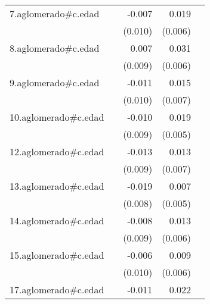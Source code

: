 {\begin{longtable}{l*{4}{D{.}{.}{-1}}}
\addlinespace
7.aglomerado#c.edad&                     &      -0.007         &       0.019\sym{**} &                     \\
            &                     &     (0.010)         &     (0.006)         &                     \\
\addlinespace
8.aglomerado#c.edad&                     &       0.007         &       0.031\sym{***}&                     \\
            &                     &     (0.009)         &     (0.006)         &                     \\
\addlinespace
9.aglomerado#c.edad&                     &      -0.011         &       0.015\sym{*}  &                     \\
            &                     &     (0.010)         &     (0.007)         &                     \\
\addlinespace
10.aglomerado#c.edad&                     &      -0.010         &       0.019\sym{***}&                     \\
            &                     &     (0.009)         &     (0.005)         &                     \\
\addlinespace
12.aglomerado#c.edad&                     &      -0.013         &       0.013         &                     \\
            &                     &     (0.009)         &     (0.007)         &                     \\
\addlinespace
13.aglomerado#c.edad&                     &      -0.019\sym{*}  &       0.007         &                     \\
            &                     &     (0.008)         &     (0.005)         &                     \\
\addlinespace
14.aglomerado#c.edad&                     &      -0.008         &       0.013\sym{*}  &                     \\
            &                     &     (0.009)         &     (0.006)         &                     \\
\addlinespace
15.aglomerado#c.edad&                     &      -0.006         &       0.009         &                     \\
            &                     &     (0.010)         &     (0.006)         &                     \\
\addlinespace
17.aglomerado#c.edad&                     &      -0.011         &       0.022\sym{**} &                     \\

\end{longtable}}
